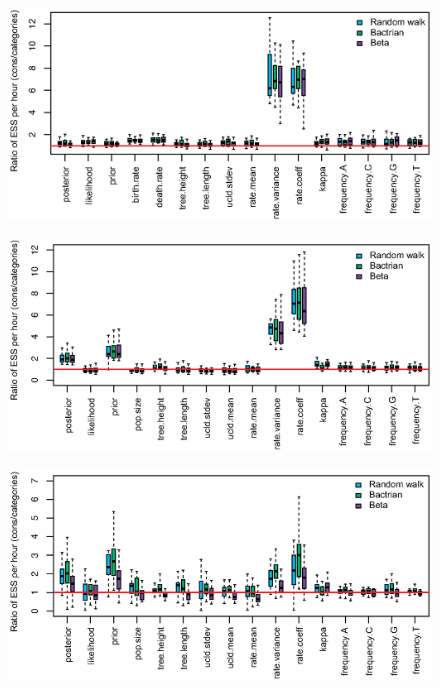 \documentclass{bmcart}
\begin{document}
\begin{backmatter}
\begin{figure}[h!]
\includegraphics[width=12cm]{Fig22-AnolisProposal.eps}\\
\caption{}
\label{anolisproposal}
\end{figure}

\begin{figure}[h!]
\includegraphics[width=12cm]{Fig23-RSV2Proposal.eps}\\
\caption{}
\label{rsv2proposal}
\end{figure}

\begin{figure}[h!]
\includegraphics[width=12cm]{Fig24-ShankarappaProposal.eps}\\
\caption{}
\label{shankarappaproposal}
\end{figure}


\end{backmatter}
\end{document}
